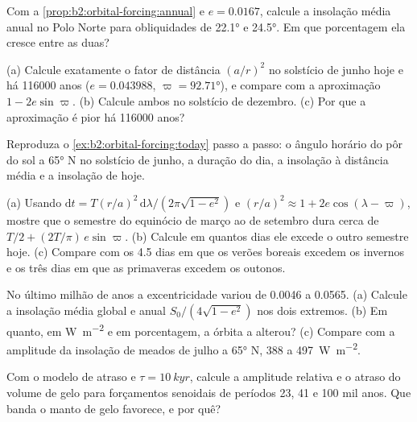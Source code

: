 \begin{exercise}[$\star$]\label{exo:b2:orbital-forcing:4}
Com a \cref{prop:b2:orbital-forcing:annual} e $e = 0.0167$, calcule a insolação média anual no
Polo Norte para obliquidades de \ang{22.1} e \ang{24.5}. Em que porcentagem ela cresce entre
as duas?
\end{exercise}

\begin{exercise}[$\star\star$]\label{exo:b2:orbital-forcing:5}
(a) Calcule exatamente o fator de distância $(a/r)^2$ no solstício de junho hoje e há \num{116000} anos
($e = 0.043988$, $\varpi = \ang{92.71}$), e compare com a aproximação $1 -
2e\sin\varpi$. (b) Calcule ambos no solstício de dezembro. (c) Por que a aproximação é pior há \num{116000}
anos?
\end{exercise}

\begin{exercise}[$\star\star$]\label{exo:b2:orbital-forcing:6}
Reproduza o \cref{ex:b2:orbital-forcing:today} passo a passo: o ângulo horário do pôr do sol a \ang{65} N
no solstício de junho, a duração do dia, a insolação à distância média e a
insolação de hoje.
\end{exercise}

\begin{exercise}[$\star\star$]\label{exo:b2:orbital-forcing:7}
(a) Usando $\mathrm dt = T(r/a)^2\,\mathrm d\lambda/(2\pi\sqrt{1 - e^2})$ e $(r/a)^2 \approx 1 +
2e\cos(\lambda - \varpi)$, mostre que o semestre do equinócio de março ao de setembro dura
cerca de $T/2 + (2T/\pi)\,e\sin\varpi$. (b) Calcule em quantos dias ele excede o outro semestre
hoje. (c) Compare com os 4.5 dias em que os verões boreais excedem os invernos e os três dias em
que as primaveras excedem os outonos.
\end{exercise}

\begin{exercise}[$\star\star$]\label{exo:b2:orbital-forcing:8}
No último milhão de anos a excentricidade variou de \num{0.0046} a \num{0.0565}. (a) Calcule
a insolação média global e anual $S_0/(4\sqrt{1 - e^2})$ nos dois extremos. (b) Em quanto, em
\unit{W.m^{-2}} e em porcentagem, a órbita a alterou? (c) Compare com a amplitude da
insolação de meados de julho a \ang{65} N, 388 a \qty{497}{W.m^{-2}}.
\end{exercise}

\begin{exercise}[$\star\star$]\label{exo:b2:orbital-forcing:9}
Com o modelo de atraso e $\tau = \qty{10}{kyr}$, calcule a amplitude relativa e o atraso do
volume de gelo para forçamentos senoidais de períodos 23, 41 e \num{100} mil anos. Que banda
o manto de gelo favorece, e por quê?
\end{exercise}

